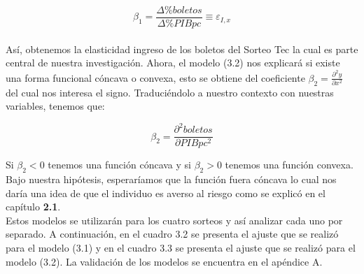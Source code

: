 \begin{equation*}
    \beta_1 = \frac{\Delta \% boletos}{\Delta \% PIB pc} \equiv \varepsilon_{I,x}
\end{equation*} \\

Así, obtenemos la elasticidad ingreso de los boletos del Sorteo Tec la cual es parte central de nuestra investigación. Ahora, el modelo (3.2) nos explicará si existe una forma funcional cóncava o convexa, esto se obtiene del coeficiente $\beta_2 = \frac{\partial^2 y}{\partial x^2}$ del cual nos interesa el signo. Traduciéndolo a nuestro contexto con nuestras variables, tenemos que:

\begin{equation*}
    \beta_2 = \frac{\partial^2 boletos}{\partial PIBpc^2}
\end{equation*}

Si $\beta_2 < 0$ tenemos una función cóncava y si $\beta_2 > 0$ tenemos una función convexa. Bajo nuestra hipótesis, esperaríamos que la función fuera cóncava lo cual nos daría una idea de que el individuo es averso al riesgo como se explicó en el capítulo \textbf{2.1}. \\

Estos modelos se utilizarán para los cuatro sorteos y así analizar cada uno por separado. A continuación, en el cuadro 3.2 se presenta el ajuste que se realizó para el modelo (3.1) y en el cuadro 3.3 se presenta el ajuste que se realizó para el modelo (3.2). La validación de los modelos se encuentra en el apéndice A. \\

